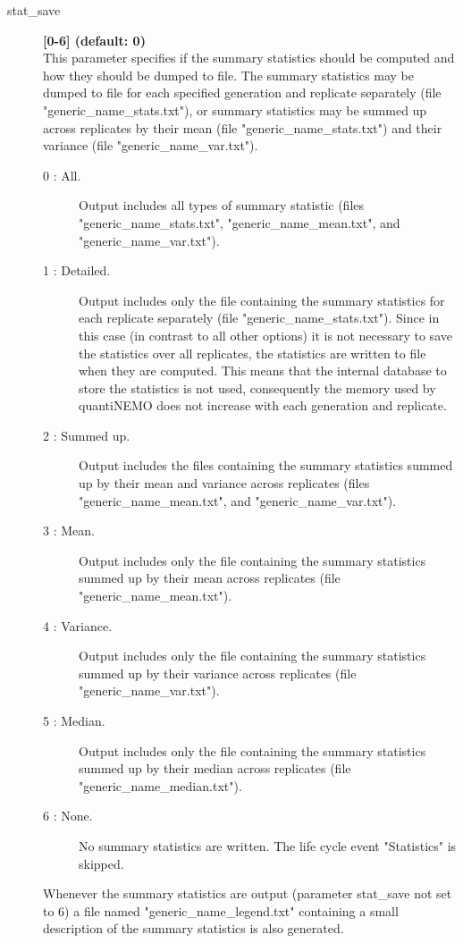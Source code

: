 \documentclass[letterpaper,12pt,oneside]{book}
\begin{document}
\begin{description}
\item[stat\_save] \textbf{[0-6] (default: 0)}\\
This parameter specifies if the summary statistics should be computed and how they should be dumped to file. The summary statistics may be dumped to file for each specified generation and replicate separately (file "generic\_name\_stats.txt"), or summary statistics may be summed up across replicates by their mean (file "generic\_name\_stats.txt") and their variance (file "generic\_name\_var.txt").
\begin{description}
\item[0 : All.] Output includes all types of summary statistic (files "generic\_name\_stats.txt", "generic\_name\_mean.txt", and "generic\_name\_var.txt").
\item[1 : Detailed.] Output includes only the file containing the summary statistics for each replicate separately (file "generic\_name\_stats.txt"). Since in this case (in contrast to all other options) it is not necessary to save the statistics over all replicates, the statistics are written to file when they are computed. This means that the internal database to store the statistics is not used, consequently the memory used by quantiNEMO does not increase with each generation and replicate.
\item[2 : Summed up.] Output includes the files containing the summary statistics summed up by their mean and variance across replicates (files "generic\_name\_mean.txt", and "generic\_name\_var.txt"). 
\item[3 : Mean.] Output includes only the file containing the summary statistics summed up by their mean across replicates (file "generic\_name\_mean.txt").
\item[4 : Variance.] Output includes only the file containing the summary statistics summed up by their variance across replicates (file "generic\_name\_var.txt").
\item[5 : Median.] Output includes only the file containing the summary statistics summed up by their median across replicates (file "generic\_name\_median.txt").
\item[6 : None.] No summary statistics are written. The life cycle event "Statistics" is skipped.
\end{description}
Whenever the summary statistics are output (parameter \textsf{stat\_save} not set to 6) a file named "generic\_name\_legend.txt" containing a small description of the summary statistics is also generated.
 

\end{description}
\end{document}

